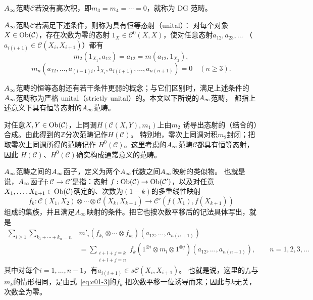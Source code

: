 $A_{\infty}$范畴$\mathcal{C}$若没有高次积，即$m_{3}=m_{4}=\cdots=0$，就称为 DG 范畴。

\begin{definition}
  $A_{\infty}$范畴$\mathcal{C}$若满足下述条件，则称为具有恒等态射（unital）：
  对每个对象$X\in\operatorname{Ob}(\mathcal{C})$，存在次数为零的态射
  $1_{X}\in\mathcal{C}^{0}(X,X)$，使对任意态射$a_{12},a_{23},\dots$
  （$a_{i(i+1)}\in\mathcal{C}(X_{i},X_{i+1})$）都有
  \[
    m_{2}(1_{X_{1}},a_{12})=a_{12}=m(a_{12},1_{X_{2}}),
  \]
  \[
    m_{n}(a_{12},\dots,a_{(i-1)i},1_{X_{i}},a_{i(i+1)},\dots,a_{n(n+1)})=0
    \quad(n\ge 3).
  \]
  \label{def:c01-2.1}
\end{definition}


$A_{\infty}$范畴的恒等态射还有若干条件更弱的概念；与它们区别时，满足上述条件的
$A_{\infty}$范畴称为严格 unital（strictly unital）的。本文以下所说的$A_{\infty}$范畴，
都指上述意义下具有恒等态射的$A_{\infty}$范畴。

对任意$X,Y\in\operatorname{Ob}(\mathcal{C})$，上同调$H(\mathcal{C}(X,Y),m_{1})$上由$m_{2}$
诱导出态射的（结合的）合成。由此得到的$\mathbb{Z}$分次范畴记作$H(\mathcal{C})$。
特别地，零次上同调对积$m_{2}$封闭；把取零次上同调所得的范畴记作
$H^{0}(\mathcal{C})$。这里考虑的$A_{\infty}$范畴$\mathcal{C}$都具有恒等态射，因此
$H(\mathcal{C})$、$H^{0}(\mathcal{C})$确实构成通常意义的范畴。

$A_{\infty}$范畴之间的$A_{\infty}$函子，定义为两个$A_{\infty}$代数之间$A_{\infty}$映射的类似物。
也就是说，$A_{\infty}$函子$\mathfrak{f}:\mathcal{C}\to\mathcal{C}'$是指：态射
$f:\operatorname{Ob}(\mathcal{C})\to\operatorname{Ob}(\mathcal{C}')$，以及对任意
$X_{1},\dots,X_{k+1}\in\operatorname{Ob}(\mathcal{C})$确定的、次数为$(1-k)$的多重线性映射
\begin{equation}
  f_{k}:\mathcal{C}(X_{1},X_{2})\otimes\cdots\otimes\mathcal{C}(X_{k},X_{k+1})
  \longrightarrow\mathcal{C}'(f(X_{1}),f(X_{k+1}))
  \label{eq:c01-3}
\end{equation}
组成的集族，并且满足$A_{\infty}$映射的条件。把它也按次数平移后的记法具体写出，就是
\[
\begin{aligned}
  \sum_{i\ge 1}\sum_{k_{1}+\cdots+k_{n}=n}
  &m'_{i}(f_{k_{1}}\otimes\cdots\otimes f_{k_{i}})(a_{12},\dots,a_{n(n+1)})\\
  &=\sum_{\substack{i+l+j=k\\ i+l+j=n}}
  f_{k}(1^{\otimes i}\otimes m_{l}\otimes 1^{\otimes j})(a_{12},\dots,a_{n(n+1)}),
  \qquad n=1,2,3,\dots
\end{aligned}
\]
其中对每个$i=1,\dots,n-1$，有$a_{i(i+1)}\in s\mathcal{C}(X_{i},X_{i+1})$。
也就是说，这里的$f_{k}$与$m_{k}$的情形相同，是由式~\eqref{eq:c01-3}的$f_{k}$
把次数平移一位诱导而来；因此与$k$无关，次数全为零。

